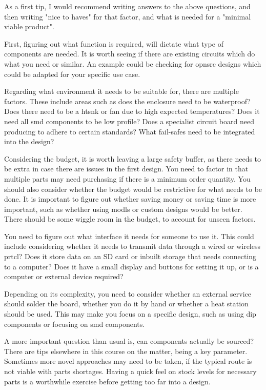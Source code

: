 \documentclass[a4paper,11pt]{report}
\begin{document}
As a first tip, I would recommend writing answers to the above questions, and then writing "nice to haves" for that factor, and what is needed for a "minimal viable product".

First, figuring out what function is required, will dictate what type of components are needed. It is worth seeing if there are existing circuits which do what you need or similar. An example could be checking for \gls{opnsrc} designs which could be adapted for your specific use case.

Regarding what environment it needs to be suitable for, there are multiple factors. These include areas such as does the enclosure need to be waterproof? Does there need to be a \gls{htsnk} or fan due to high expected temperatures? Does it need all \gls{smd} components to be low profile? Does a specialist circuit board need producing to adhere to certain standards? What fail-safes need to be integrated into the design?

Considering the budget, it is worth leaving a large safety buffer, as there needs to be extra in case there are issues in the first design. You need to factor in that multiple parts may need purchasing if there is a minimum order quantity. You should also consider whether the budget would be restrictive for what needs to be done. It is important to figure out whether saving money or saving time is more important, such as whether using \gls{modl}s or custom designs would be better. There should be some wiggle room in the budget, to account for unseen factors.

You need to figure out what interface it needs for someone to use it. This could include considering whether it needs to transmit data through a wired or wireless \gls{prtcl}? Does it store data on an SD card or inbuilt storage that needs connecting to a computer? Does it have a small display and buttons for setting it up, or is a computer or external device required?

Depending on its complexity, you need to consider whether an external service should solder the board, whether you do it by hand or whether a heat station should be used. This may make you focus on a specific design, such as using \gls{dip} components or focusing on \gls{smd} components.

A more important question than usual is, can components actually be sourced? There are tips elsewhere in this course on the matter, being a key parameter. Sometimes more novel approaches may need to be taken, if the typical route is not viable with parts shortages. Having a quick feel on stock levels for necessary parts is a worthwhile exercise before getting too far into a design.
\end{document}
